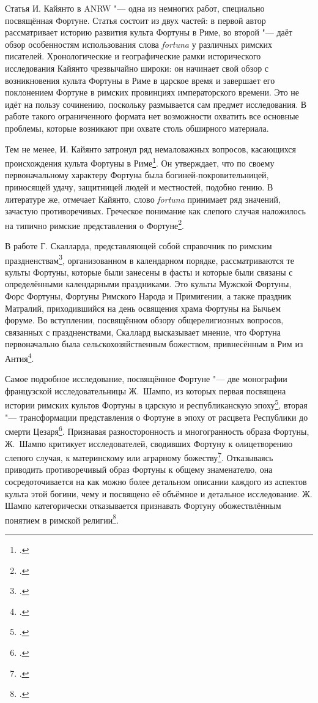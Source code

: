 
Статья И. Кайянто в ANRW "--- одна из немногих работ, специально посвящённая Фортуне. Статья состоит из двух частей: в первой автор рассматривает историю развития культа Фортуны в Риме, во второй "--- даёт обзор особенностям использования слова \textit{fortuna} у различных римских писателей. Хронологические и географические рамки исторического исследования Кайянто чрезвычайно широки: он начинает свой обзор с возникновения культа Фортуны в Риме в царское время и завершает его поклонением Фортуне в римских провинциях императорского времени. Это не идёт на пользу сочинению, поскольку размывается сам предмет исследования. В работе такого ограниченного формата нет возможности охватить все основные проблемы, которые возникают при охвате столь обширного материала.

Тем не менее, И. Кайянто затронул ряд немаловажных вопросов, касающихся происхождения культа Фортуны в Риме\footcite[S. 504]{Kajanto1981}. Он утверждает, что по своему первоначальному характеру Фортуна была богиней-покровительницей, приносящей удачу, защитницей людей и местностей, подобно гению. В литературе же, отмечает Кайянто, слово \textit{fortuna} принимает ряд значений, зачастую противоречивых. Греческое понимание  как слепого случая наложилось на типично римские представления о Фортуне\footcite{Kajanto1981}.


В работе Г. Скалларда, представляющей собой справочник по римским праздненствам\footcite{Scullard1981}, организованном в календарном порядке, рассматриваются те культы Фортуны, которые были занесены в фасты и которые были связаны с определёнными календарными праздниками. Это культы Мужской Фортуны, Форс Фортуны, Фортуны Римского Народа и Примигении, а также праздник Матралий, приходившийся на день освящения храма Фортуны на Бычьем форуме. Во вступлении, посвящённом обзору общерелигиозных вопросов, связанных с праздненствами, Скаллард высказывает мнение, что Фортуна первоначально была сельскохозяйственным божеством, привнесённым в Рим из Антия\footcite[P. 19]{Scullard1981}.


Самое подробное исследование, посвящённое Фортуне "--- две монографии французской исследовательницы Ж.~Шампо, из которых первая посвящена истории римских культов Фортуны в царскую и республиканскую эпоху\footcite{Champeaux1982}, вторая "--- трансформации представления о Фортуне в эпоху от расцвета Республики до смерти Цезаря\footcite{Champeaux1987}. Признавая разносторонность и многогранность образа Фортуны, Ж.~Шампо критикует исследователей, сводивших Фортуну к олицетворению слепого случая, к материнскому или аграрному божеству\footcite[P. VIII--XIV]{Champeaux1982}. Отказываясь приводить противоречивый образ Фортуны к общему знаменателю, она сосредоточивается на как можно более детальном описании каждого из аспектов культа этой богини, чему и посвящено её объёмное и детальное исследование. Ж. Шампо категорически отказывается признавать Фортуну обожествлённым понятием в римской религии\footcite[P. XXI]{Champeaux1982}.

